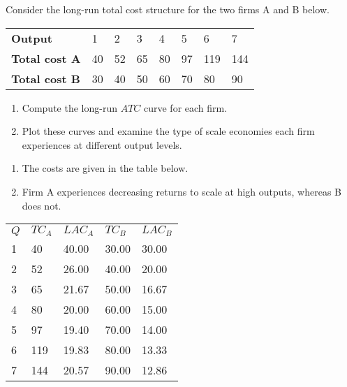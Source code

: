 \begin{enumialphparenastyle}
\begin{econex}\label{ex:ch8ex4}
Consider the long-run total cost structure for the two firms A and B below.
\begin{Table}{}
\begin{tabu} to 35em {|X[2.5,c]X[1,c]X[1,c]X[1,c]X[1,c]X[1,c]X[1,c]X[1,c]|}	\hline
{}	\textbf{Output} & 1 & 2 & 3 & 4 & 5 & 6 & 7 \\ 
						\textbf{Total cost A} & 40 & 52 & 65 & 80 & 97 & 119 & 144 \\ 
	\textbf{Total cost B} & 30 & 40 & 50 & 60 & 70 & 80 & 90 \\	\hline
\end{tabu}
\end{Table}
\begin{enumerate}
	\item	Compute the long-run $ATC$ curve for each firm.
	\item	Plot these curves and examine the type of scale economies each firm experiences at different output levels.
\end{enumerate}
\begin{econsolution}
\begin{enumerate}
	\item	The costs are given in the table below.
	\item	Firm A experiences decreasing returns to scale at high outputs, whereas B does not.
\end{enumerate}
\begin{Table}{}
	\begin{tabu} to \linewidth {|X[1,c]X[1,c]X[1,c]X[1,c]X[1,c]|}	\hline
		 $Q$ & $TC_A$ & $LAC_A$ & $TC_B$ & $LAC_B$ \\
		1	&	40	&	40.00	&	30.00	&	30.00	\\
		2	&	52	&	26.00	&	40.00	&	20.00	\\
		3	&	65	&	21.67	&	50.00	&	16.67	\\
		4	&	80	&	20.00	&	60.00	&	15.00	\\
		5	&	97	&	19.40	&	70.00	&	14.00	\\
		6	&	119	&	19.83	&	80.00	&	13.33	\\
		7	&	144	&	20.57	&	90.00	&	12.86 	\\	\hline
	\end{tabu}
\end{Table}
\begin{center*}
	\begin{tikzpicture}[background color=figurebkgdcolour,use background]

\end{tikzpicture}
\end{center*}
\end{econsolution}
\end{econex}
\end{enumialphparenastyle}
